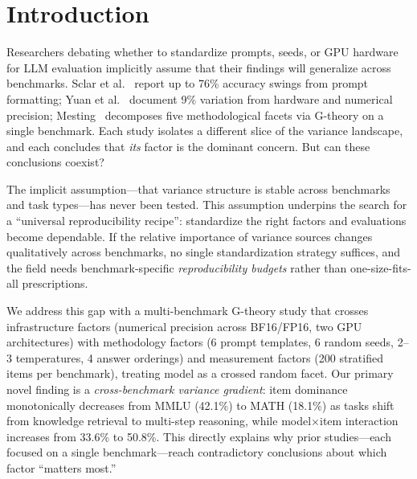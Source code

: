 \documentclass[11pt,a4paper]{article}
\begin{document}
\section{Introduction}

Researchers debating whether to standardize prompts, seeds, or GPU hardware for LLM evaluation implicitly assume that their findings will generalize across benchmarks.
Sclar et al.~\citeyearpar{sclar2024} report up to 76\% accuracy swings from prompt formatting; Yuan et al.~\citeyearpar{yuan2025} document 9\% variation from hardware and numerical precision; Mesting~\citeyearpar{mesting2026} decomposes five methodological facets via G-theory on a single benchmark.
Each study isolates a different slice of the variance landscape, and each concludes that \emph{its} factor is the dominant concern.
But can these conclusions coexist?

The implicit assumption---that variance structure is stable across benchmarks and task types---has never been tested.
This assumption underpins the search for a ``universal reproducibility recipe'': standardize the right factors and evaluations become dependable.
If the relative importance of variance sources changes qualitatively across benchmarks, no single standardization strategy suffices, and the field needs benchmark-specific \emph{reproducibility budgets} rather than one-size-fits-all prescriptions.

We address this gap with a multi-benchmark G-theory study that crosses infrastructure factors (numerical precision across BF16/FP16, two GPU architectures) with methodology factors (6 prompt templates, 6 random seeds, 2--3 temperatures, 4 answer orderings) and measurement factors (200 stratified items per benchmark), treating model as a crossed random facet.
Our primary novel finding is a \emph{cross-benchmark variance gradient}: item dominance monotonically decreases from MMLU (42.1\%) to MATH (18.1\%) as tasks shift from knowledge retrieval to multi-step reasoning, while model$\times$item interaction increases from 33.6\% to 50.8\%.
This directly explains why prior studies---each focused on a single benchmark---reach contradictory conclusions about which factor ``matters most.''
\end{document}

